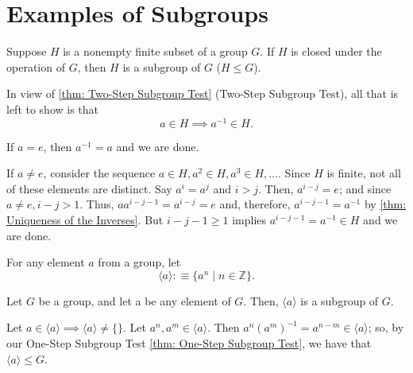 \section{Examples of Subgroups}

\begin{thm}
  \label{thm: Finite Subgroup Test}
  Suppose $H$ is a nonempty finite subset of a group $G$. If $H$ is closed under the operation of $G$, then $H$ is a subgroup of $G$ ($H \leq G$).
\end{thm}
\begin{prf}
  In view of \ref{thm: Two-Step Subgroup Test} (Two-Step Subgroup Test), all that is left to show is that
  \begin{equation}
    a \in H \implies a^{-1} \in H.
  \end{equation}

  If $a=e$, then $a^{-1} = a$ and we are done.

  If $a \neq e$, consider the sequence $a \in H, a^2 \in H, a^3 \in H, \ldots.$ Since $H$ is finite, not all of these elements are distinct. Say $a^i=a^j$ and $i>j$. Then, $a^{i-j} = e$; and since $a\neq e, i-j >1$. Thus, $aa^{i-j-1} = a^{i-j}=e$ and, therefore, $a^{i-j-1}=a^{-1}$ by \ref{thm: Uniqueness of the Inverses}. But $i-j-1 \geq 1$ implies $a^{i-j-1}=a^{-1}\in H$ and we are done.
\end{prf}

\begin{mydef}
  For any element $a$ from a group, let
  \begin{equation}
    \langle a \rangle : \equiv \{ a^{n} \mid n \in \mathbb{Z} \}.
  \end{equation}
\end{mydef}

\begin{thm}
  Let $G$ be a group, and let a be any element of $G$. Then, $\langle a \rangle$ is a subgroup of $G$.
\end{thm}
\begin{prf}
  Let $a \in \langle a \rangle \implies \langle a \rangle \neq \{ \}.$ Let $a^n, a^m \in \langle a \rangle$. Then $a^n(a^m)^{-1} = a^{n-m} \in \langle a \rangle$; so, by our One-Step Subgroup Test \ref{thm: One-Step Subgroup Test}, we have that $\langle a \rangle \leq G$.
\end{prf}

